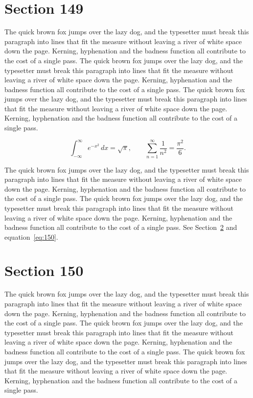 \documentclass{article}
\begin{document}
\section{Section 149}
\label{sec:149}
The quick brown fox jumps over the lazy dog, and the typesetter must break this paragraph into lines that fit the measure without leaving a river of white space down the page. Kerning, hyphenation and the badness function all contribute to the cost of a single pass. The quick brown fox jumps over the lazy dog, and the typesetter must break this paragraph into lines that fit the measure without leaving a river of white space down the page. Kerning, hyphenation and the badness function all contribute to the cost of a single pass. The quick brown fox jumps over the lazy dog, and the typesetter must break this paragraph into lines that fit the measure without leaving a river of white space down the page. Kerning, hyphenation and the badness function all contribute to the cost of a single pass. 

\begin{equation}\label{eq:149}
\int_{-\infty}^{\infty} e^{-x^{2}}\,dx = \sqrt{\pi}, \qquad
\sum_{n=1}^{\infty} \frac{1}{n^{2}} = \frac{\pi^{2}}{6}.
\end{equation}

The quick brown fox jumps over the lazy dog, and the typesetter must break this paragraph into lines that fit the measure without leaving a river of white space down the page. Kerning, hyphenation and the badness function all contribute to the cost of a single pass. The quick brown fox jumps over the lazy dog, and the typesetter must break this paragraph into lines that fit the measure without leaving a river of white space down the page. Kerning, hyphenation and the badness function all contribute to the cost of a single pass. 
See Section~\ref{sec:150} and equation~\eqref{eq:150}.
\section{Section 150}
\label{sec:150}
The quick brown fox jumps over the lazy dog, and the typesetter must break this paragraph into lines that fit the measure without leaving a river of white space down the page. Kerning, hyphenation and the badness function all contribute to the cost of a single pass. The quick brown fox jumps over the lazy dog, and the typesetter must break this paragraph into lines that fit the measure without leaving a river of white space down the page. Kerning, hyphenation and the badness function all contribute to the cost of a single pass. The quick brown fox jumps over the lazy dog, and the typesetter must break this paragraph into lines that fit the measure without leaving a river of white space down the page. Kerning, hyphenation and the badness function all contribute to the cost of a single pass. 
\end{document}
